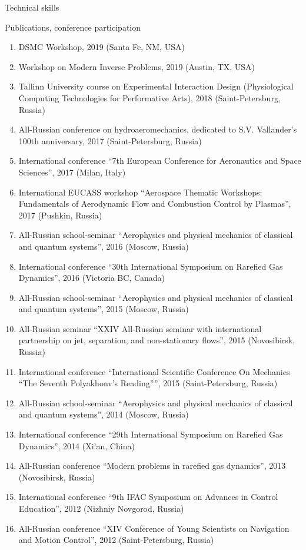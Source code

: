 \documentclass{resume} %
\begin{document}
\begin{rSection}{Technical skills}
\begin{rSection}{Publications, conference participation}
\begin{enumerate}
    \item DSMC Workshop, 2019 (Santa Fe, NM, USA)
    \item Workshop on Modern Inverse Problems, 2019 (Austin, TX, USA)
    \item Tallinn University course on Experimental Interaction Design (Physiological Computing Technologies for Performative Arts), 2018 (Saint-Petersburg, Russia)
    \item All-Russian conference on hydroaeromechanics, dedicated to S.V. Vallander's 100th anniversary, 2017 (Saint-Petersburg, Russia)
    \item International conference ``7th European Conference for Aeronautics and Space Sciences'', 2017 (Milan, Italy)
    \item International EUCASS workshop ``Aerospace Thematic Workshops: Fundamentals of Aerodynamic Flow and Combustion Control by Plasmas'', 2017 (Pushkin, Russia)
    \item All-Russian school-seminar ``Aerophysics and physical mechanics of classical and quantum systems'', 2016 (Moscow, Russia)
    \item International conference ``30th International Symposium on Rarefied Gas Dynamics'', 2016 (Victoria BC, Canada)
    \item All-Russian school-seminar ``Aerophysics and physical mechanics of classical and quantum systems'', 2015 (Moscow, Russia)
    \item All-Russian seminar ``XXIV All-Russian seminar with international partnership on jet, separation, and non-stationary flows'', 2015 (Novosibirsk, Russia)
    \item International conference ``International Scientific Conference On Mechanics ``The Seventh Polyakhonv's Reading'''', 2015 (Saint-Petersburg, Russia)
    \item All-Russian school-seminar ``Aerophysics and physical mechanics of classical and quantum systems'', 2014 (Moscow, Russia)
    \item International conference ``29th International Symposium on Rarefied Gas Dynamics'', 2014 (Xi'an, China)
    \item All-Russian conference ``Modern problems in rarefied gas dynamics'', 2013 (Novosibirsk, Russia)
    \item International conference ``9th IFAC Symposium on Advances in Control Education'', 2012 (Nizhniy Novgorod, Russia)
    \item All-Russian conference ``XIV Conference of Young Scientists on Navigation and Motion Control'', 2012 (Saint-Petersburg, Russia)
\end{enumerate}

\end{rSection}

\end{rSection}


\end{document}

